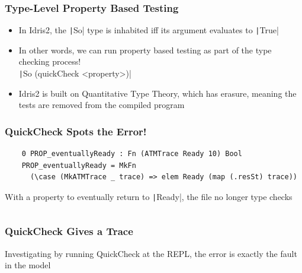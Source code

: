 \documentclass[compress]{beamer}
\begin{document}
\begin{frame}[fragile]
  \frametitle{Type-Level Property Based Testing}

  \large

  \begin{itemize}
    \item<1-> In Idris2, the \texttt|So| type is inhabited iff its
              argument evaluates to \texttt|True|
    \item<2-> In other words, we can run property based testing as part of the
              type checking process!\\
              \texttt|So (quickCheck <property>)|
    \item<3-> Idris2 is built on Quantitative Type Theory, which has erasure,
              meaning the tests are removed from the compiled program
  \end{itemize}

\end{frame}


\begin{frame}[fragile]
  \frametitle{QuickCheck Spots the Error!}

  \large

  \begin{verbatim}
    0 PROP_eventuallyReady : Fn (ATMTrace Ready 10) Bool
    PROP_eventuallyReady = MkFn
      (\case (MkATMTrace _ trace) => elem Ready (map (.resSt) trace))
  \end{verbatim}

  \pause

  With a property to eventually return to \texttt|Ready|, the file no
  longer type checks

  \pause

  \inputminted[fontsize=\normalsize]{Idris}{qc-things/ATM-qc-error.idr}

\end{frame}


\begin{frame}[fragile]
  \frametitle{QuickCheck Gives a Trace}

  \large

  Investigating by running QuickCheck at the REPL, the error is exactly the
  fault in the model

  \pause

  \inputminted[fontsize=\small]{Idris}{qc-things/qc-trace-4.idr}

\end{frame}
\end{document}
